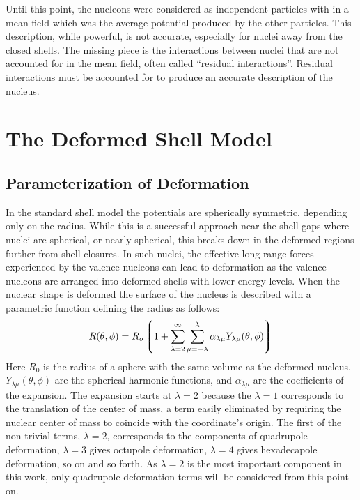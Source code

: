 Until this point, the nucleons were considered as independent particles with in a mean field which was the average potential produced by the other particles. This description, while powerful, is not accurate, especially for nuclei away from the closed shells. The missing piece is the interactions between nuclei that are not accounted for in the mean field, often called ``residual interactions''. Residual interactions must be accounted for to produce an accurate description of the nucleus.

\section{The Deformed Shell Model}
\label{sec:models-shell-model-def-sm}
\subsection{Parameterization of Deformation}
\label{ssec:models-shell-model-def-param}
In the standard shell model the potentials are spherically symmetric, depending only on the radius. While this is a successful approach near the shell gaps where nuclei are spherical, or nearly spherical, this breaks down in the deformed regions further from shell closures. In such nuclei, the effective long-range forces experienced by the valence nucleons can lead to deformation as the valence nucleons are arranged into deformed shells with lower energy levels. When the nuclear shape is deformed the surface of the nucleus is described with a parametric function defining the radius as follows:
\begin{equation}
\label{eqn:surface-full-expansion}
R(\theta, \phi) = R_{o}\left \lgroup 1 + \sum_{\lambda = 2}^{\infty}\sum_{\mu = -\lambda}^{\lambda}\alpha_{\lambda \mu} Y_{\lambda \mu}(\theta, \phi)\right \rgroup
\end{equation} 
Here $R_0$ is the radius of a sphere with the same volume as the deformed nucleus, $Y_{\lambda \mu}(\theta, \phi)$ are the spherical harmonic functions, and $\alpha_{\lambda \mu}$ are the coefficients of the expansion. The expansion starts at $\lambda = 2$ because the $\lambda = 1$ corresponds to the translation of the center of mass, a term easily eliminated by requiring the nuclear center of mass to coincide with the coordinate's origin. The first of the non-trivial terms, $\lambda = 2$, corresponds to the components of quadrupole deformation, $\lambda = 3$ gives octupole deformation, $\lambda = 4$ gives hexadecapole deformation, so on and so forth. As $\lambda = 2$ is the most important component in this work, only quadrupole deformation terms will be considered from this point on.

